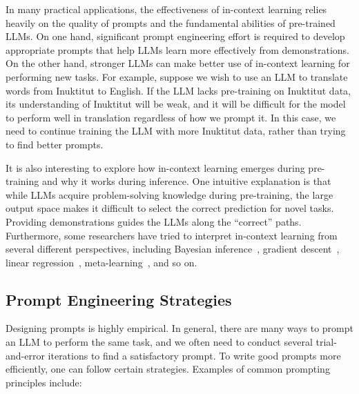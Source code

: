 In many practical applications, the effectiveness of in-context learning relies heavily on the quality of prompts and the fundamental abilities of pre-trained LLMs. On one hand, significant prompt engineering effort is required to develop appropriate prompts that help LLMs learn more effectively from demonstrations. On the other hand, stronger LLMs can make better use of in-context learning for performing new tasks. For example, suppose we wish to use an LLM to translate words from Inuktitut to English. If the LLM lacks pre-training on Inuktitut data, its understanding of Inuktitut will be weak, and it will be difficult for the model to perform well in translation regardless of how we prompt it. In this case, we need to continue training the LLM with more Inuktitut data, rather than trying to find better prompts.

It is also interesting to explore how in-context learning emerges during pre-training and why it works during inference. One intuitive explanation is that while LLMs acquire problem-solving knowledge during pre-training, the large output space makes it difficult to select the correct prediction for novel tasks. Providing demonstrations guides the LLMs along the ``correct'' paths. Furthermore, some researchers have tried to interpret in-context learning from several different perspectives, including Bayesian inference~\cite{xie-etal:2022an}, gradient descent~\cite{dai-etal:2023can,von-etal:2023transformers}, linear regression~\cite{akyurek-etal:2023what}, meta-learning~\cite{garg-etal:2022can}, and so on.

\subsection{Prompt Engineering Strategies}

\noindent Designing prompts is highly empirical. In general, there are many ways to prompt an LLM to perform the same task, and we often need to conduct several trial-and-error iterations to find a satisfactory prompt. To write good prompts more efficiently, one can follow certain strategies. Examples of common prompting principles include:

